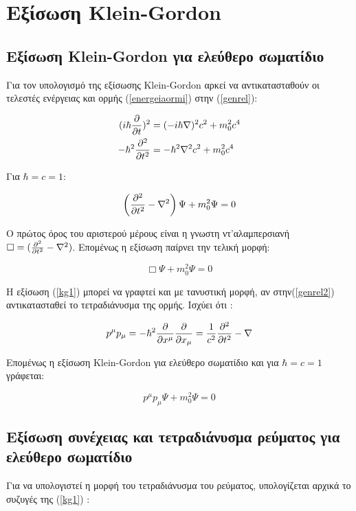 \section{Εξίσωση \textlatin{Klein-Gordon}}

\subsection{Εξίσωση \textlatin{Klein-Gordon} για ελεύθερο σωματίδιο}
Για τον υπολογισμό της εξίσωσης \textlatin{Klein-Gordon} αρκεί να αντικατασταθούν οι τελεστές ενέργειας και ορμής (\ref{energeiaormi}) στην (\ref{genrel}): 

\begin{align}
 \notag (i\hbar \frac{\partial }{\partial t} )^2 &= (-i\hbar \nabla)^2 c^2 +m_0 ^2 c^4
  \\ -\hbar^2 \frac{\partial ^2}{\partial t^2} &= -\hbar^2 \nabla^2 c^2 +m_0^2 c^4 
  \label{kg1} 
\end{align}

Για $\hbar=c=1$: 

\[
\left(  \frac{\partial ^2}{\partial t^2}-\nabla^2 \right)  \Psi +m_0^2 \Psi = 0
\]

Ο πρώτος όρος του αριστερού μέρους είναι η γνωστη ντ'αλαμπερσιανή $\Box = (\frac{\partial ^2}{\partial t^2}-\nabla^2) $. Επομένως η εξίσωση παίρνει την τελική μορφή: 

\[
  \Box \Psi +m_0^2 \Psi = 0  
\]

Η εξίσωση (\ref{kg1}) μπορεί να γραφτεί και με τανυστική μορφή, αν στην(\ref{genrel2})  αντικατασταθεί το τετραδιάνυσμα της ορμής. Ισχύει ότι : 

\[ 
{p}^\mu {p}_\mu=-\hbar^2 \frac{\partial }{\partial x^\mu}\frac{\partial }{\partial x_\mu}=\frac{1}{c^2} \frac{\partial ^2}{\partial t^2} -\nabla
\]

Επομένως η εξίσωση \textlatin{Klein-Gordon} για ελεύθερο σωματίδιο και για $\hbar = c = 1 $ γράφεται: 

\begin{equation}
  {p}^\mu {p}_\mu \Psi +m_0^2 \Psi = 0
  \label{kg2}
\end{equation}
\subsection{Εξίσωση συνέχειας και τετραδιάνυσμα ρεύματος για ελεύθερο σωματίδιο}  

Για να υπολογιστεί η μορφή του τετραδιάνυσμα του ρεύματος, υπολογίζεται αρχικά το συζυγές της (\ref{kg1}) :

